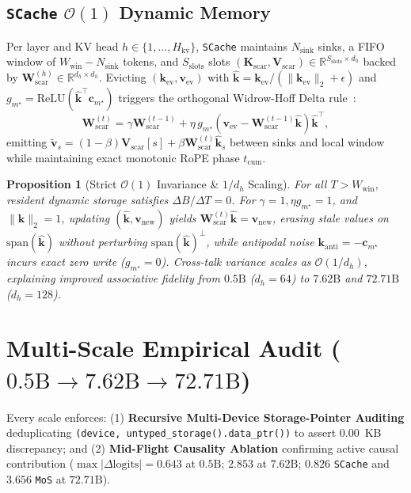 \documentclass[10pt,twocolumn]{article}
\newtheorem{proposition}{Proposition}
\begin{document}
\subsection{\texttt{SCache} $\mathcal{O}(1)$ Dynamic Memory}
Per layer and KV head $h \in \{1,\dots,H_{\text{kv}}\}$, \texttt{SCache} maintains $N_{\text{sink}}$ sinks, a FIFO window of $W_{\text{win}} - N_{\text{sink}}$ tokens, and $S_{\text{slots}}$ slots $(\mathbf{K}_{\text{scar}}, \mathbf{V}_{\text{scar}}) \in \mathbb{R}^{S_{\text{slots}} \times d_h}$ backed by $\mathbf{W}_{\text{scar}}^{(h)} \in \mathbb{R}^{d_h \times d_h}$. Evicting $(\mathbf{k}_{\text{ev}}, \mathbf{v}_{\text{ev}})$ with $\hat{\mathbf{k}} = \mathbf{k}_{\text{ev}} / (\|\mathbf{k}_{\text{ev}}\|_2 + \epsilon)$ and $g_{m^\star} = \mathrm{ReLU}(\hat{\mathbf{k}}^\top \mathbf{c}_{m^\star})$ triggers the orthogonal Widrow-Hoff Delta rule~\citep{widrow1960adaptive}:
\begin{equation}
    \mathbf{W}_{\text{scar}}^{(t)} = \gamma \mathbf{W}_{\text{scar}}^{(t-1)} + \eta\, g_{m^\star} \!\left(\mathbf{v}_{\text{ev}} - \mathbf{W}_{\text{scar}}^{(t-1)} \hat{\mathbf{k}}\right) \hat{\mathbf{k}}^\top,
    \label{eq:delta}
\end{equation}
emitting $\widetilde{\mathbf{v}}_s = (1 - \beta)\mathbf{V}_{\text{scar}}[s] + \beta \mathbf{W}_{\text{scar}}^{(t)} \hat{\mathbf{k}}_s$ between sinks and local window while maintaining exact monotonic RoPE phase $t_{\text{cum}}$.

\begin{proposition}[Strict $\mathcal{O}(1)$ Invariance \& $1/d_h$ Scaling]
\label{prop:invariance}
For all $T > W_{\text{win}}$, resident dynamic storage satisfies $\Delta B / \Delta T = 0$. For $\gamma = 1, \eta g_{m^\star} = 1$, and $\|\hat{\mathbf{k}}\|_2 = 1$, updating $(\hat{\mathbf{k}}, \mathbf{v}_{\text{new}})$ yields $\mathbf{W}_{\text{scar}}^{(t)} \hat{\mathbf{k}} = \mathbf{v}_{\text{new}}$, erasing stale values on $\mathrm{span}(\hat{\mathbf{k}})$ without perturbing $\mathrm{span}(\hat{\mathbf{k}})^\perp$, while antipodal noise $\mathbf{k}_{\text{anti}} = -\mathbf{c}_{m^\star}$ incurs exact zero write ($g_{m^\star} = 0$). Cross-talk variance scales as $\mathcal{O}(1/d_h)$, explaining improved associative fidelity from $0.5\text{B}$ ($d_h=64$) to $7.62\text{B}$ and $72.71\text{B}$ ($d_h=128$).
\end{proposition}

\section{Multi-Scale Empirical Audit ($0.5\text{B} \to 7.62\text{B} \to 72.71\text{B}$)}
Every scale enforces: (1) \textbf{Recursive Multi-Device Storage-Pointer Auditing} deduplicating \texttt{(device, untyped\_storage().data\_ptr())} to assert $0.00$~KB discrepancy; and (2) \textbf{Mid-Flight Causality Ablation} confirming active causal contribution ($\max |\Delta\text{logits}| = 0.643$ at $0.5\text{B}$; $2.853$ at $7.62\text{B}$; $0.826$ \texttt{SCache} and $3.656$ \texttt{MoS} at $72.71\text{B}$).
\end{document}
